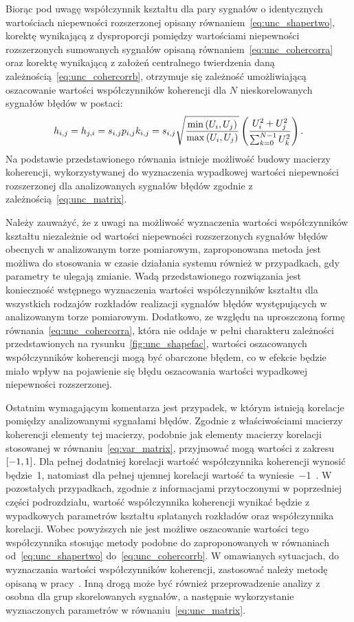 Biorąc pod uwagę współczynnik kształtu dla pary sygnałów o identycznych wartościach niepewności rozszerzonej opisany równaniem~\eqref{eq:unc_shapertwo}, korektę wynikającą z dysproporcji pomiędzy wartościami niepewności rozszerzonych sumowanych sygnałów opisaną równaniem~\eqref{eq:unc_cohercorra} oraz korektę wynikającą z założeń centralnego twierdzenia daną zależnością~\eqref{eq:unc_cohercorrb}, otrzymuje się zależność umożliwiającą oszacowanie wartości współczynników koherencji dla $N$ nieskorelowanych sygnałów błędów w postaci:
\begin{equation}
h_{i,j} = h_{j,i} = s_{i,j} p_{i,j} k_{i,j} = s_{i,j} \sqrt{\frac{\min \left(U_{i}, U_{j}\right)}{\max \left(U_{i}, U_{j}\right)}} \left( \frac{U_{i}^{2} + U_{j}^{2}}{\sum _{k = 0} ^{N-1} U_{k}^{2}} \right) \label{eq:unc_coher}.
\end{equation}
Na podstawie przedstawionego równania istnieje możliwość budowy macierzy koherencji, wykorzystywanej do wyznaczenia wypadkowej wartości niepewności rozszerzonej dla analizowanych sygnałów błędów zgodnie z zależnością~\eqref{eq:unc_matrix}.

Należy zauważyć, że z uwagi na możliwość wyznaczenia wartości współczynników kształtu niezależnie od wartości niepewności rozszerzonych sygnałów błędów obecnych w analizowanym torze pomiarowym, zaproponowana metoda jest możliwa do stosowania w czasie działania systemu również w przypadkach, gdy parametry te ulegają zmianie. Wadą przedstawionego rozwiązania jest konieczność wstępnego wyznaczenia wartości współczynników kształtu dla wszystkich rodzajów rozkładów realizacji sygnałów błędów występujących w analizowanym torze pomiarowym. Dodatkowo, ze względu na uproszczoną formę równania~\eqref{eq:unc_cohercorra}, która nie oddaje w pełni charakteru zależności przedstawionych na rysunku~\ref{fig:unc_shapefac}, wartości oszacowanych współczynników koherencji mogą być obarczone błędem, co w efekcie będzie miało wpływ na pojawienie się błędu oszacowania wartości wypadkowej niepewności rozszerzonej.

Ostatnim wymagającym komentarza jest przypadek, w którym istnieją korelacje pomiędzy analizowanymi sygnałami błędów. Zgodnie z właściwościami macierzy koherencji elementy tej macierzy, podobnie jak elementy macierzy korelacji stosowanej w równaniu~\eqref{eq:var_matrix}, przyjmować mogą wartości z zakresu $\interval{-1}{1}$. Dla pełnej dodatniej korelacji wartość współczynnika koherencji wynosić będzie~\num{1}, natomiast dla pełnej ujemnej korelacji wartość ta wyniesie~\num{-1}~\cite{jakubiec_redmono}. W pozostałych przypadkach, zgodnie z informacjami przytoczonymi w poprzedniej części podrozdziału, wartość współczynnika koherencji wynikać będzie z wypadkowych parametrów kształtu splatanych rozkładów oraz współczynnika korelacji. Wobec powyższych nie jest możliwe oszacowanie wartości tego współczynnika stosując metody podobne do zaproponowanych w równaniach od~\eqref{eq:unc_shapertwo} do~\eqref{eq:unc_cohercorrb}. W omawianych sytuacjach, do wyznaczania wartości współczynników koherencji, zastosować należy metodę opisaną w pracy~\cite{jakubiec_reductive}. Inną drogą może być również przeprowadzenie analizy z osobna dla grup skorelowanych sygnałów, a następnie wykorzystanie wyznaczonych parametrów w równaniu~\eqref{eq:unc_matrix}.

